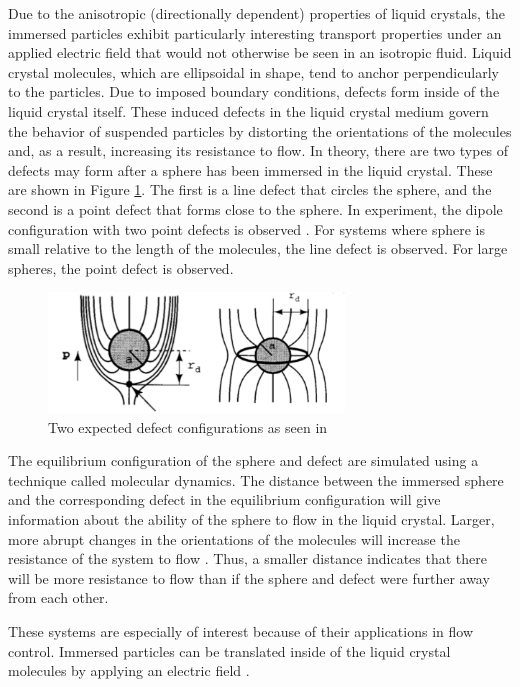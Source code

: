 \documentclass[preprint, aps]{revtex4-1}
\begin{document}
Due to the anisotropic (directionally dependent) properties of liquid crystals, 
the immersed particles exhibit particularly interesting transport properties 
under an applied electric field that would not otherwise be seen in an isotropic 
fluid. Liquid crystal molecules, which are ellipsoidal in shape, tend to anchor 
perpendicularly to the particles. Due to imposed boundary conditions, defects 
form inside of the liquid crystal itself. These induced defects in the liquid 
crystal medium govern the behavior of suspended particles by distorting the 
orientations of the molecules and, as a result, increasing its resistance to
flow. In theory, there are two types of defects may form after a sphere has been 
immersed in the liquid crystal. These are shown in Figure 
\ref{fig:defect-config}. The first is a line defect that circles the sphere, 
and the second is a point defect that forms close to the sphere. In experiment, 
the dipole configuration with two point defects is observed \cite{lubensky98}. 
For systems where sphere is small relative to the length of the molecules, the
line defect is observed. For large spheres, the point defect is observed.
	\begin{figure}[H]
		\centering
		\includegraphics[width=0.7\textwidth]{defect-config.png}
		\caption{Two expected defect configurations as seen in 
		\cite{lubensky98}}
		\label{fig:defect-config}
	\end{figure}

The equilibrium configuration of the sphere and defect are simulated using a
technique called molecular dynamics. The distance between the immersed sphere 
and the corresponding defect in the equilibrium configuration will give 
information about the ability of the sphere to flow in the liquid crystal. 
Larger, more abrupt changes in the orientations of the molecules will increase 
the resistance of the system to flow \cite{billeter00}. Thus, a smaller distance
indicates that there will be more resistance to flow than if the sphere and
defect were further away from each other.

These systems are especially of interest because of their applications in flow 
control. Immersed particles can be translated inside of the liquid crystal
molecules by applying an electric field \cite{conklin17}. 
\end{document}
